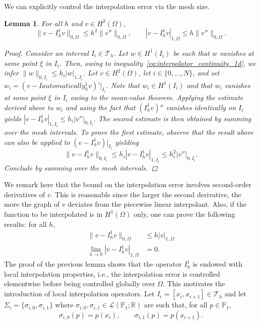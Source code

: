 \documentclass{article}
\newtheorem{lemma}{Lemma}
\begin{document}
We can explicitly control the interpolation error via the mesh size.
\begin{lemma}
    For all $h$ and $v \in H^2(\Omega)$,
    $$ \|v - I_h^1 v\|_{0,\Omega} \le h^2 \|v''\|_{0,\Omega},\qquad  |v - I_h^1 v|_{1,\Omega} \le h \|v''\|_{0,\Omega}. $$
\begin{proof}

    Consider an interval $I_i \in \mathcal{T}_h$. Let $w \in H^1(I_i)$ be such that $w$ vanishes at some point $\xi$ in $I_i$. Then, owing to inequality~\ref{eq:interpolator_continuity_1d}, we infer $\|w\|_{0,I_i} \le h_i |w|_{1,I_i}$.
    Let $v \in H^2(\Omega)$, let $i \in \{0, \dots, N\}$, and set $w_i = (v - Iautomatically_h^1 v)'|_{I_i}$. Note that $w_i \in H^1(I_i)$ and that $w_i$ vanishes at some point $\xi$ in $I_i$ owing to the mean-value theorem. Applying the estimate derived above to $w_i$ and using the fact that $(I_h^1 v)''$ vanishes identically on $I_i$ yields $|v - I_h^1 v|_{1,I_i} \le h_i |v''|_{0,I_i}$. The second estimate is then obtained by summing over the mesh intervals. To prove the first estimate, observe that the result above can also be applied to $(v - I_h^1 v)|_{I_i}$ yielding
    $$ \|v - I_h^1 v\|_{0,I_i} \le h_i |v - I_h^1 v|_{1,I_i} \le h_i^2 |v''|_{0,I_i}. $$
    Conclude by summing over the mesh intervals.
\end{proof}
\end{lemma}
We remark here that the bound on the interpolation error involves second-order derivatives of $v$. This is reasonable since the larger the second derivative, the more the graph of $v$ deviates from the piecewise linear interpolant. Also, if the function to be interpolated is in $H^1(\Omega)$ only, one can prove the following results: for all $h$,
\begin{align*}
    \|v - I_h^1 v\|_{0,\Omega} &\le h |v|_{1,\Omega}\\
    \lim_{h \rightarrow 0} |v - I_h^1 v|_{1,\Omega} &= 0.
\end{align*}
The proof of the previous lemma shows that the operator $I_h^1$ is endowed with local interpolation properties, i.e., the interpolation error is controlled elementwise before being controlled globally over $\Omega$. This motivates the introduction of local interpolation operators. Let $I_i = [x_i, x_{i+1}] \in \mathcal{T}_h$ and let $\Sigma_i = \{\sigma_{i,0}, \sigma_{i,1}\}$ where $\sigma_{i,0}, \sigma_{i,1} \in \mathcal{L}(\mathbb{P}_1; \mathbb{R})$ are such that, for all $p \in \mathbb{P}_1$,
$$ \sigma_{i,0}(p) = p(x_i),\qquad \sigma_{i,1}(p) = p(x_{i+1}). $$
\end{document}
